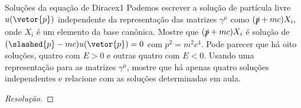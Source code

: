 \begin{exercício}{Soluções da equação de Dirac}{ex1}
    Podemos escrever a solução de partícula livre \(u(\vetor{p})\) independente da representação das matrizes \(\gamma^\mu\) como \((\slashed{p} + mc) X_i,\) onde \(X_i\) é um elemento da base canônica. Mostre que \((\slashed{p} + mc) X_i\) é solução de \((\slashed{p} - mc)u(\vetor{p}) = 0\) com \(p^2 = m^2c^4\). Pode parecer que há oito soluções, quatro com \(E > 0\) e outras quatro com \(E < 0.\) Usando uma representação para as matrizes \(\gamma^\mu\), mostre que há apenas quatro soluções independentes e relacione com as soluções determinadas em aula.
\end{exercício}
\begin{proof}[Resolução]
    
\end{proof}
